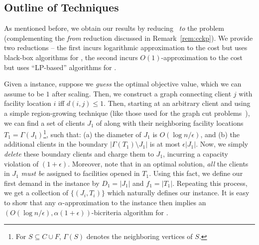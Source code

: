 \subsection{Outline of Techniques} \label{sec:overview}
As mentioned before, we obtain our results by reducing \mckc~{\em to} the \cckp problem (complementing the {\em from} reduction  discussed in Remark~\ref{rem:cckp}).
We provide two reductions -- the first incurs logarithmic approximation to the cost but uses black-box algorithms for \cckp, the second incurs $O(1)$-approximation to the cost but uses ``LP-based'' algorithms for \cckp.

\medskip {}
Given a \mckc instance, suppose we \emph{guess} the optimal objective value, which we can assume to be $1$ after scaling. Then, we construct a graph connecting client $j$ with facility location $i$ iff $d(i,j) \leq 1$.
Then, starting at an arbitrary client and using a simple region-growing technique (like those used for the graph cut problems~\cite{LeightonR99,GargVY96}), we can find a set of clients $J_1$ of along with their neighboring facility locations $T_1 = \Gamma(J_1)$\footnote{For $S \subseteq C \cup F$, $\Gamma(S)$ denotes the neighboring vertices  of $S$.}, such that: (a) the diameter of $J_1$ is $O(\log n/\epsilon)$, and (b) the additional clients in the boundary $|\Gamma(T_1) \setminus J_1|$ is at most $\epsilon |J_1|$. Now, we simply \emph{delete} these boundary clients and charge them to $J_1$, incurring a capacity violation of $(1+\epsilon)$. Moreover, note that in an optimal solution, \emph{all} the clients in $J_1$ \emph{must be} assigned to facilities opened in $T_1$. Using this fact, we define our first demand in the \cckp instance by $D_1 = |J_1|$ and $f_1 = |T_1|$. Repeating this process, we get a collection of $\{(J_i,T_i)\}$ which naturally defines our \cckp instance. It is easy to show that any $\alpha$-approximation to the \cckp instance then implies an $(O(\log n/\epsilon),  \alpha(1+\epsilon))$-bicriteria algorithm for \mckc.

\iffalse
The weaker decomposition theorem (Theorem~\ref{thm:weakdecomp}) states that we can delete a subset $\Cd$ of clients and partition the residual instance into portions we call {\em complete neighborhood sets} (Definition~\ref{def:comp-nbr}) of $O(\log n/\epsilon)$ diameter.
These sets consists of subsets of facilities $T_i$ and clients $J_i$ such that the optimal solution \emph{must} assign clients in $J_i$ to facilities in $T_i$. This collection of complete-neighborhood sets then naturally leads to a \cckp instance (Remark~\ref{rem:red})
whose solutions translate to \mckc solutions with $O(\log n/\epsilon)$ hit on the cost. Furthermore, the deleted clients $\Cd$ can be charged to clients in $C\setminus \Cd$ such that the capacity of facilities only increase by an $\epsilon$-factor.
We use the {\em region growing technique} which have been used for cut problems~\cite{LeightonR99,GargVY96} to find the set $\Cd$; we keep on growing balls till the total external demand is at most $\epsilon$ times the internal demand.
$O(\log n/\eps)$-radius balls suffice. %
\fi

